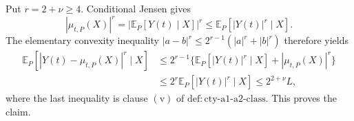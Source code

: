 Put \(r=2+\nu\geq4\).  Conditional Jensen gives
\[
 |\mu_{t,P}(X)|^r
 =|\mathbb E_P[Y(t)\mid X]|^r
 \leq\mathbb E_P[|Y(t)|^r\mid X].
\]
The elementary convexity inequality \(|a-b|^r\leq2^{r-1}(|a|^r+|b|^r)\) therefore yields
\[
\begin{aligned}
 \mathbb E_P[|Y(t)-\mu_{t,P}(X)|^r\mid X]
 &\leq2^{r-1}\{\mathbb E_P[|Y(t)|^r\mid X]+|\mu_{t,P}(X)|^r\}\\
 &\leq2^r\mathbb E_P[|Y(t)|^r\mid X]
 \leq2^{2+\nu}L,
\end{aligned}
\]
where the last inequality is clause \(\mathrm{(v)}\) of \(\mathrm{def:cty\text{-}a1\text{-}a2\text{-}class}\).  This proves the claim.